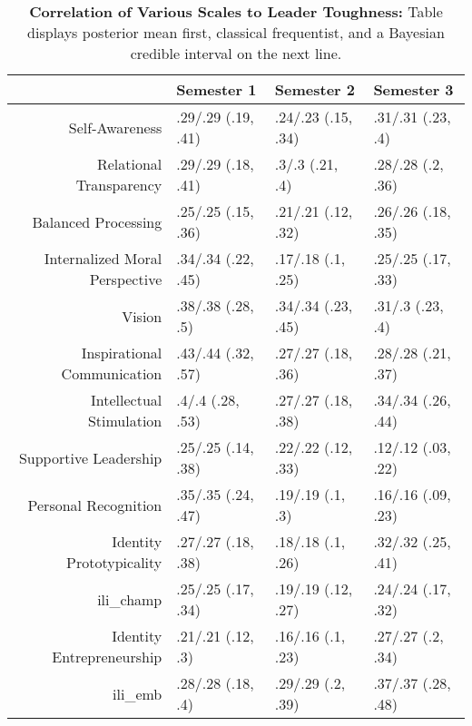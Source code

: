 \begin{table}[ht]
\centering
\begin{tabular}{rlll}
  \hline
 & Semester 1 & Semester 2 & Semester 3 \\ 
  \hline
Self-Awareness & .29/.29 (.19, .41) & .24/.23 (.15, .34) & .31/.31 (.23, .4) \\ 
  Relational Transparency & .29/.29 (.18, .41) & .3/.3 (.21, .4) & .28/.28 (.2, .36) \\ 
  Balanced Processing & .25/.25 (.15, .36) & .21/.21 (.12, .32) & .26/.26 (.18, .35) \\ 
  Internalized Moral Perspective & .34/.34 (.22, .45) & .17/.18 (.1, .25) & .25/.25 (.17, .33) \\ 
  Vision & .38/.38 (.28, .5) & .34/.34 (.23, .45) & .31/.3 (.23, .4) \\ 
  Inspirational Communication & .43/.44 (.32, .57) & .27/.27 (.18, .36) & .28/.28 (.21, .37) \\ 
  Intellectual Stimulation & .4/.4 (.28, .53) & .27/.27 (.18, .38) & .34/.34 (.26, .44) \\ 
  Supportive Leadership & .25/.25 (.14, .38) & .22/.22 (.12, .33) & .12/.12 (.03, .22) \\ 
  Personal Recognition & .35/.35 (.24, .47) & .19/.19 (.1, .3) & .16/.16 (.09, .23) \\ 
  Identity Prototypicality & .27/.27 (.18, .38) & .18/.18 (.1, .26) & .32/.32 (.25, .41) \\ 
  ili\_champ & .25/.25 (.17, .34) & .19/.19 (.12, .27) & .24/.24 (.17, .32) \\ 
  Identity Entrepreneurship & .21/.21 (.12, .3) & .16/.16 (.1, .23) & .27/.27 (.2, .34) \\ 
  ili\_emb & .28/.28 (.18, .4) & .29/.29 (.2, .39) & .37/.37 (.28, .48) \\ 
   \hline
\end{tabular}
\caption{\textbf{Correlation of Various Scales to Leader Toughness:} Table displays posterior mean first, classical frequentist, and a Bayesian credible interval on the next line.} 
\label{tab:lead_corr}
\end{table}
